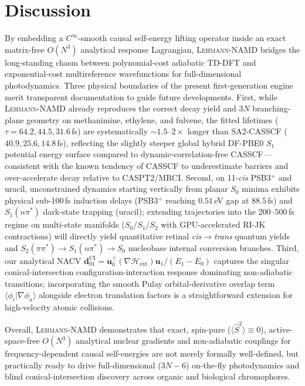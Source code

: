 \documentclass[10pt,twocolumn]{article}
\theoremstyle{natthm}
\newcommand{\leh}{\textsc{Lehmann-NAMD}}
\newcommand{\Hext}{\mathcal{H}_{\mathrm{ext}}}
\newcommand{\Ssq}{\langle\hat{S}^2\rangle}
\newcommand{\dCI}{\mathbf{d}_{01}^{\mathrm{CI}}}
\begin{document}
\section*{Discussion}
By embedding a $C^\infty$-smooth causal self-energy lifting operator inside an exact matrix-free $O(N^3)$ analytical response Lagrangian, \leh{} bridges the long-standing chasm between polynomial-cost adiabatic TD-DFT and exponential-cost multireference wavefunctions for full-dimensional photodynamics.
Three physical boundaries of the present first-generation engine merit transparent documentation to guide future developments.
First, while \leh{} already reproduces the correct decay yield and $3N$ branching-plane geometry on methanimine, ethylene, and fulvene, the fitted lifetimes ($\tau=64.2, 44.5, 31.6$\,fs) are systematically $\sim 1.5$--$2\times$ longer than SA2-CASSCF ($40.9, 25.6, 14.8$\,fs), reflecting the slightly steeper global hybrid DF-PBE0 $S_1$ potential energy surface compared to dynamic-correlation-free CASSCF---consistent with the known tendency of CASSCF to underestimate barriers and over-accelerate decay relative to CASPT2/MRCI\cite{barbatti2004ethylene,curchod2018namd}.
Second, on 11-\emph{cis} PSB3$^+$ and uracil, unconstrained dynamics starting vertically from planar $S_0$ minima exhibits physical sub-100\,fs induction delays (PSB3$^+$ reaching $0.51$\,eV gap at $88.5$\,fs) and $S_1(n\pi^*)$ dark-state trapping (uracil); extending trajectories into the $200$--$500$\,fs regime on multi-state manifolds ($S_0/S_1/S_2$ with GPU-accelerated RI-JK contractions) will directly yield quantitative retinal \emph{cis}$\to$\emph{trans} quantum yields and $S_2(\pi\pi^*)\to S_1(n\pi^*)\to S_0$ nucleobase internal conversion branches.
Third, our analytical NACV $\dCI=\mathbf{u}_0^\top(\nabla\Hext)\mathbf{u}_1/(E_1-E_0)$ captures the singular conical-intersection configuration-interaction response dominating non-adiabatic transitions; incorporating the smooth Pulay orbital-derivative overlap term $\langle\phi_i|\nabla\phi_a\rangle$ alongside electron translation factors is a straightforward extension for high-velocity atomic collisions.

Overall, \leh{} demonstrates that exact, spin-pure ($\Ssq\equiv 0$), active-space-free $O(N^3)$ analytical nuclear gradients and non-adiabatic couplings for frequency-dependent causal self-energies are not merely formally well-defined, but practically ready to drive full-dimensional ($3N{-}6$) on-the-fly photodynamics and blind conical-intersection discovery across organic and biological chromophores.
\end{document}
